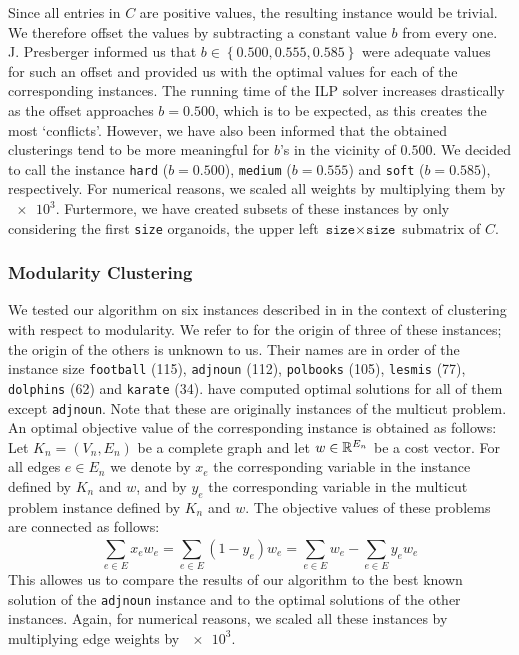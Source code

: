 Since all entries in $C$ are positive values, the resulting \CP instance would be trivial.
We therefore offset the values by subtracting a constant value $b$ from every one.
J. Presberger informed us that $b \in \left\{ 0.500, 0.555, 0.585 \right\}$ were adequate values for such an offset and provided us with the optimal values for each of the corresponding instances.
The running time of the ILP solver increases drastically as the offset approaches $b = 0.500$, which is to be expected, as this creates the most ‘conflicts’.
However, we have also been informed that the obtained clusterings tend to be more meaningful for $b$’s in the vicinity of $0.500$.
We decided to call the instance \texttt{hard} ($b= 0.500$), \texttt{medium} ($b = 0.555$) and \texttt{soft} ($b = 0.585$), respectively.
For numerical reasons, we scaled all weights by multiplying them by $\num{e3}$.
Furtermore, we have created subsets of these instances by only considering the first \texttt{size} organoids, \ie the upper left $\texttt{size} \times \texttt{size}$ submatrix of $C$.

\subsubsection{Modularity Clustering}
We tested our algorithm on six instances described in \cite{kappesComparativeStudyModern2015} in the context of clustering with respect to modularity.
We refer to \cite{brandesModularityClustering2008} for the origin of three of these instances; the origin of the others is unknown to us.
Their names are in order of the instance size \texttt{football} (115), \texttt{adjnoun} (112), \texttt{polbooks} (105), \texttt{lesmis} (77), \texttt{dolphins} (62) and \texttt{karate} (34).
\cite{kappesComparativeStudyModern2015} have computed optimal solutions for all of them except \texttt{adjnoun}.
Note that these are originally instances of the multicut problem.
An optimal objective value of the corresponding \CP instance is obtained as follows:
Let $K_{n} = (V_{n}, E_{n})$ be a complete graph and let $w \in \mathbb{R}^{E_{n}}$ be a cost vector.
For all edges $e \in E_{n}$ we denote by $x_{e}$ the corresponding variable in the \CP instance defined by $K_{n}$ and $w$, and by $y_{e}$ the corresponding variable in the multicut problem instance defined by $K_{n}$ and $w$.
The objective values of these problems are connected as follows:
\[
	\sum_{e \in E} x_{e} w_{e} = \sum_{e \in E}^{} (1-y_{e}) w_{e} = \sum_{e \in E}^{} w_{e} - \sum_{e \in E}^{} y_{e} w_{e}
\]
This allowes us to compare the results of our algorithm to the best known solution of the \texttt{adjnoun} instance and to the optimal solutions of the other instances. 
Again, for numerical reasons, we scaled all these instances by multiplying edge weights by $\num{e3}$.

